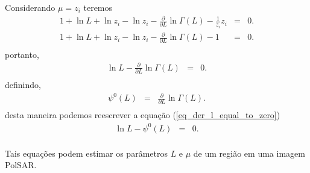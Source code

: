Considerando $\mu=z_i$ teremos
\begin{equation}\nonumber
\begin{array}{ccc}
	1 + \ln L + \ln z_{i}-\ln z_i -\frac{\partial}{\partial L}\ln \Gamma(L)-\frac{1}{z_i} z_i&=&0.\\
	1 + \ln L + \ln z_{i}-\ln z_i -\frac{\partial}{\partial L}\ln \Gamma(L)-1&=&0.\\
\end{array}
\end{equation}
portanto,
\begin{equation}\label{eq_der_l_equal_to_zero}
\begin{array}{ccc}
	\ln L -\frac{\partial}{\partial L}\ln \Gamma(L)&=&0.\\
\end{array}
\end{equation}
definindo,
\begin{equation}\label{poly_gamma_function_order_zero}
\begin{array}{ccc}
	\psi^0(L)&=&\frac{\partial}{\partial L}\ln \Gamma(L).\\
\end{array}
\end{equation}
desta maneira podemos reescrever a equação (\ref{eq_der_l_equal_to_zero}) 
\begin{equation}\label{eq_der_l_equal_to_zero_psi}
\begin{array}{ccc}
	\ln L -\psi^0(L)&=&0.\\
\end{array}
\end{equation}

Tais equações podem estimar os parâmetros $L$ e $\mu$ de um região em uma imagem PolSAR.


